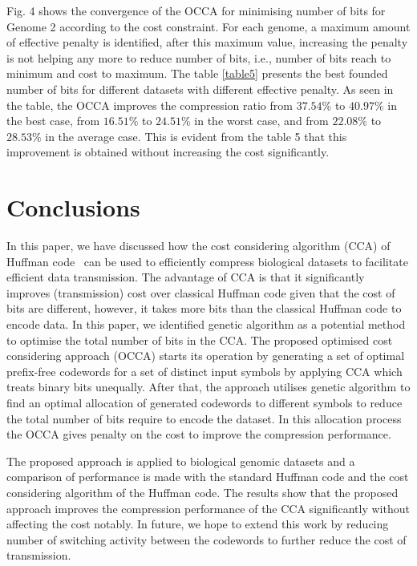 \documentclass{singlecol-new}
\theoremstyle{TH}{
\newtheorem{lemma}{Lemma}
\newtheorem{theorem}[lemma]{Theorem}
\newtheorem{corrolary}[lemma]{Corrolary}
\newtheorem{conjecture}[lemma]{Conjecture}
\newtheorem{proposition}[lemma]{Proposition}
\newtheorem{claim}[lemma]{Claim}
\newtheorem{stheorem}[lemma]{Wrong Theorem}
}
\theoremstyle{THrm}{
\newtheorem{definition}{Definition}
\newtheorem{question}{Question}
\newtheorem{remark}{Remark}
\newtheorem{scheme}{Scheme}
}
\theoremstyle{THhit}{
\newtheorem{case}{Case}[section]
}
\begin{document}
Fig. 4 shows the convergence of the OCCA for
minimising number of bits for Genome 2 according to the cost constraint. For each genome, a maximum amount of effective penalty is identified, after this maximum value, increasing the penalty is not helping any more to reduce number of bits, i.e., number of bits reach to minimum and cost to maximum.  The table \ref{table5} presents the best founded number of bits for different datasets with different effective penalty. As seen in the table, the OCCA improves the compression ratio from $37.54\%$ to $40.97\%$ in the best case, from $16.51\%$ to $24.51\%$ in the worst case, and from $22.08\%$ to $28.53\%$ in the average case. This is evident from the table 5 that this improvement is obtained without increasing the cost significantly.    %

\section{Conclusions}
\label{sec5}
In this paper, we have discussed how the cost considering  algorithm (CCA) of Huffman code~\citep{Kab14} can be used to efficiently compress  biological datasets to facilitate efficient data transmission. The advantage of CCA is that it significantly improves (transmission) cost over classical Huffman code given that the cost of bits are different, however, it takes more bits than the classical Huffman code to encode data. In this paper, we identified genetic algorithm as a potential method to optimise the total number of bits in the CCA. The proposed optimised cost considering approach (OCCA) starts its operation by generating a set of optimal prefix-free codewords for a set of distinct input symbols by applying CCA which treats binary bits unequally. After that, the approach utilises genetic algorithm to find an optimal allocation of generated codewords to different symbols to reduce the total number of bits require to encode the dataset. In this allocation process the OCCA gives penalty on the cost to improve the compression performance.
 
The proposed approach is applied to biological genomic datasets and a comparison of performance  is made with the standard Huffman code and the cost considering algorithm of the Huffman code. The results show that the proposed approach improves the compression performance of the CCA significantly without affecting the cost notably. In future, we hope to extend this work by reducing number of switching activity between the codewords to further reduce the cost of transmission.
\end{document}

